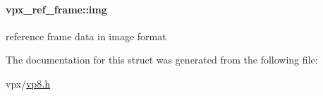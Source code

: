 \paragraph[{\texorpdfstring{img}{img}}]{ vpx\+\_\+ref\+\_\+frame\+::img}\hypertarget{structvpx__ref__frame_a972d24d0243f51f84eef7e1b79c6c414}{}\label{structvpx__ref__frame_a972d24d0243f51f84eef7e1b79c6c414}
reference frame data in image format 

The documentation for this struct was generated from the following file\+:\begin{DoxyCompactItemize}
\item 
vpx/\hyperlink{vp8_8h}{vp8.\+h}\end{DoxyCompactItemize}
